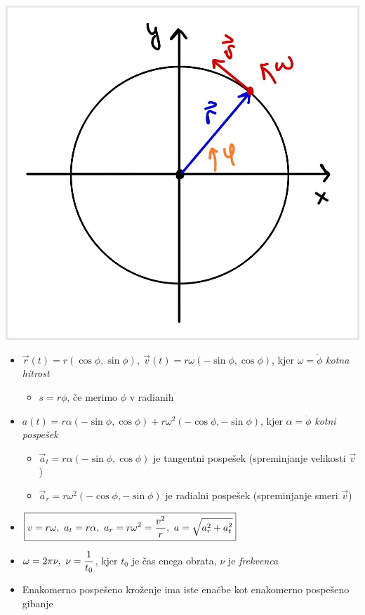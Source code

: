 \begin{minipage}[t]{0.25\textwidth}
    \vspace{0pt}
  \includegraphics[width=\linewidth]{img/01_003.jpg} 
\end{minipage}
\hfill
\begin{minipage}[t]{0.70\textwidth}
    \vspace{0pt}
    \begin{itemize}
        \item \(\vec{r}(t) = r (\cos \phi, \sin \phi), \ \vec{v}(t) = r \omega (-\sin \phi, \cos \phi)\), kjer \(\omega = \dot{\phi}\) \emph{kotna hitrost}
        \begin{itemize}
            \item \(s = r \phi\), če merimo \(\phi\) v radianih
        \end{itemize}
        \item \(a(t) = r \alpha (-\sin \phi, \cos \phi) + r \omega^2 (-\cos \phi, -\sin \phi)\), kjer \(\alpha = \ddot{\phi}\) \emph{kotni pospešek}
        \begin{itemize}
            \item \(\vec{a}_t = r \alpha (-\sin \phi, \cos \phi)\) je tangentni pospešek (spreminjanje velikosti \(\vec{v}\))    
            \item \(\vec{a}_r = r \omega^2 (-\cos \phi, -\sin \phi)\) je radialni pospešek (spreminjanje smeri \(\vec{v}\))        
        \end{itemize}
        \item \(\displaystyle \boxed{v = r \omega,\ a_t = r \alpha, \ a_r = r \omega^2 = \frac{v^2}{r}, \ a = \sqrt{a_r^2 + a_t^2}}\)
        \item \(\displaystyle \omega = 2 \pi \nu, \ \nu = \frac{1}{t_0}\), kjer \(t_0\) je čas enega obrata, \(\nu\) je \emph{frekvenca}
        \item Enakomerno pospešeno kroženje ima iste enačbe kot enakomerno pospešeno gibanje
    \end{itemize}
\end{minipage}

